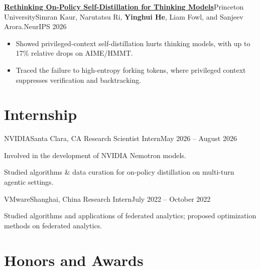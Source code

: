 \documentclass[a4paper,11pt]{article}
\begin{document}
{\resumePublication
{\href{https://arxiv.org/abs/2607.05184}{\textbf{Rethinking On-Policy Self-Distillation for Thinking Models}}}{Princeton University}{Simran Kaur, Narutatsu Ri, \textbf{Yinghui He}, Liam Fowl, and Sanjeev Arora.}{NeurIPS 2026}

\begin{itemize}[leftmargin=*, itemsep=0.2mm]
  \item Showed privileged-context self-distillation hurts thinking models, with up to 17\% relative drops on AIME/HMMT.
  \item Traced the failure to high-entropy forking tokens, where privileged context suppresses verification and backtracking.
\end{itemize}

}
\vspace{-6mm}

\section{\textbf{Internship}}
\vspace{-0.4mm}
\resumeSubHeadingListStart
\resumeSubheading
{NVIDIA}{Santa Clara, CA}
{Research Scientist Intern}{May 2026 -- August 2026} \vspace{2mm}
\resumeItemListStart
    \item Involved in the development of NVIDIA Nemotron models.
  \item Studied algorithms \& data curation for on-policy distillation on multi-turn agentic settings.
\resumeItemListEnd

\resumeSubheading
{VMware}{Shanghai, China}
{Research Intern}{July 2022 -- October 2022} \vspace{2mm}
\resumeItemListStart
  \item Studied algorithms and applications of federated analytics; proposed optimization methods on federated analytics.
\resumeItemListEnd

\resumeSubHeadingListEnd
\vspace{-7mm}

\section{\textbf{Honors and Awards}}
\vspace{-0.4mm}
\resumeSubHeadingListStart
\end{document}
